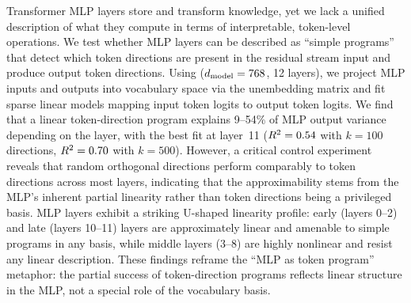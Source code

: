 Transformer MLP layers store and transform knowledge, yet we lack a unified description of what they compute in terms of interpretable, token-level operations.
We test whether MLP layers can be described as ``simple programs'' that detect which token directions are present in the residual stream input and produce output token directions.
Using \gpttwo ($d_{\text{model}}=768$, 12 layers), we project MLP inputs and outputs into vocabulary space via the unembedding matrix and fit sparse linear models mapping input token logits to output token logits.
We find that a linear token-direction program explains 9--54\% of MLP output variance depending on the layer, with the best fit at layer~11 ($R^2=0.54$ with $k=100$ directions, $R^2=0.70$ with $k=500$).
However, a critical control experiment reveals that random orthogonal directions perform comparably to token directions across most layers, indicating that the approximability stems from the MLP's inherent partial linearity rather than token directions being a privileged basis.
MLP layers exhibit a striking U-shaped linearity profile: early (layers 0--2) and late (layers 10--11) layers are approximately linear and amenable to simple programs in any basis, while middle layers (3--8) are highly nonlinear and resist any linear description.
These findings reframe the ``MLP as token program'' metaphor: the partial success of token-direction programs reflects linear structure in the MLP, not a special role of the vocabulary basis.
